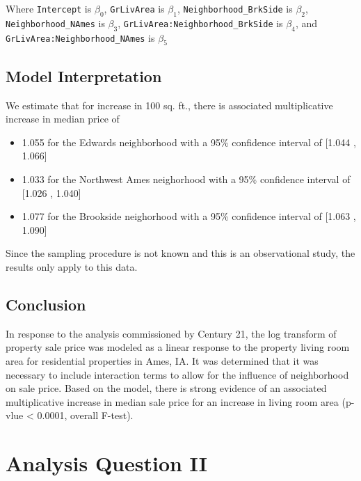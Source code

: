 \documentclass[american,]{article}
\providecommand{\tightlist}{%
  \setlength{\itemsep}{0pt}\setlength{\parskip}{0pt}}
\begin{document}
Where \texttt{Intercept} is \(\beta_0\), \texttt{GrLivArea} is
\(\beta_1\), \texttt{Neighborhood\_BrkSide} is \(\beta_2\),
\texttt{Neighborhood\_NAmes} is \(\beta_3\),
\texttt{GrLivArea:Neighborhood\_BrkSide} is \(\beta_4\), and
\texttt{GrLivArea:Neighborhood\_NAmes} is \(\beta_5\)

\hypertarget{model-interpretation}{%
\subsection{Model Interpretation}\label{model-interpretation}}

We estimate that for increase in 100 sq. ft., there is associated
multiplicative increase in median price of

\begin{itemize}
\tightlist
\item
  1.055 for the Edwards neighborhood with a 95\% confidence interval of
  {[}1.044 , 1.066{]}
\item
  1.033 for the Northwest Ames neighorhood with a 95\% confidence
  interval of {[}1.026 , 1.040{]}
\item
  1.077 for the Brookside neighorhood with a 95\% confidence interval of
  {[}1.063 , 1.090{]}
\end{itemize}

Since the sampling procedure is not known and this is an observational
study, the results only apply to this data.

\hypertarget{conclusion}{%
\subsection{Conclusion}\label{conclusion}}

In response to the analysis commissioned by Century 21, the log
transform of property sale price was modeled as a linear response to the
property living room area for residential properties in Ames, IA. It was
determined that it was necessary to include interaction terms to allow
for the influence of neighborhood on sale price. Based on the model,
there is strong evidence of an associated multiplicative increase in
median sale price for an increase in living room area (p-vlue
\textless{} 0.0001, overall F-test).

\hypertarget{analysis-question-ii}{%
\section{Analysis Question II}\label{analysis-question-ii}}
\end{document}
